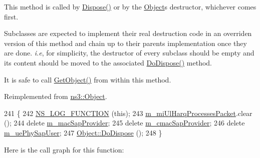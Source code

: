 This method is called by \hyperlink{classns3_1_1Object_aa90ae598863f6c251cdab3c3722afdaf}{Dispose()} or by the \hyperlink{classns3_1_1Object}{Object}\textquotesingle{}s destructor, whichever comes first.

Subclasses are expected to implement their real destruction code in an overriden version of this method and chain up to their parent\textquotesingle{}s implementation once they are done. {\itshape i.\+e}, for simplicity, the destructor of every subclass should be empty and its content should be moved to the associated \hyperlink{classns3_1_1LteUeMac_a9d346eeb8b11ca89525ac539035dd3a0}{Do\+Dispose()} method.

It is safe to call \hyperlink{classns3_1_1Object_a13e18c00017096c8381eb651d5bd0783}{Get\+Object()} from within this method. 

Reimplemented from \hyperlink{classns3_1_1Object_a475d429a75d302d4775f4ae32479b287}{ns3\+::\+Object}.


\begin{DoxyCode}
241 \{
242   \hyperlink{log-macros-disabled_8h_a90b90d5bad1f39cb1b64923ea94c0761}{NS\_LOG\_FUNCTION} (\textcolor{keyword}{this});
243   \hyperlink{classns3_1_1LteUeMac_af895ce47f438d39c2753740352120c45}{m\_miUlHarqProcessesPacket}.clear ();
244   \textcolor{keyword}{delete} \hyperlink{classns3_1_1LteUeMac_adce91277155c23716dca4726844748f9}{m\_macSapProvider};
245   \textcolor{keyword}{delete} \hyperlink{classns3_1_1LteUeMac_a57844092e81ef266986bdd2e9cde67ad}{m\_cmacSapProvider};
246   \textcolor{keyword}{delete} \hyperlink{classns3_1_1LteUeMac_a0a82d69ceccdff5053c6b7984032d19f}{m\_uePhySapUser};
247   \hyperlink{classns3_1_1Object_a475d429a75d302d4775f4ae32479b287}{Object::DoDispose} ();
248 \}
\end{DoxyCode}


Here is the call graph for this function\+:


